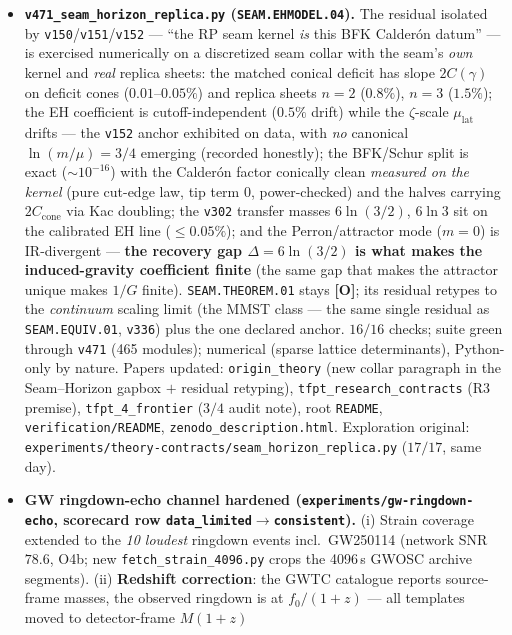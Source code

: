 \documentclass[11pt]{article}
\providecommand{\mO}{\textbf{[O]}}\providecommand{\mX}{\textbf{[X]}}
\begin{document}
\begin{itemize}[leftmargin=1.5em]
\item \textbf{\texttt{v471\_seam\_horizon\_replica.py} (\texttt{SEAM.EHMODEL.04}).} The residual isolated by
\texttt{v150}/\texttt{v151}/\texttt{v152} --- ``the RP seam kernel \emph{is} this BFK Calder\'on datum'' ---
is exercised numerically on a discretized seam collar with the seam's \emph{own} kernel and \emph{real}
replica sheets: the matched conical deficit has slope $2C(\gamma)$ on deficit cones ($0.01$--$0.05\%$) and
replica sheets $n{=}2$ ($0.8\%$), $n{=}3$ ($1.5\%$); the EH coefficient is cutoff-independent ($0.5\%$
drift) while the $\zeta$-scale $\mu_{\mathrm{lat}}$ drifts --- the \texttt{v152} anchor exhibited on data,
with \emph{no} canonical $\ln(m/\mu){=}3/4$ emerging (recorded honestly); the BFK/Schur split is exact
(${\sim}10^{-16}$) with the Calder\'on factor conically clean \emph{measured on the kernel} (pure cut-edge
law, tip term $0$, power-checked) and the halves carrying $2C_{\mathrm{cone}}$ via Kac doubling; the
\texttt{v302} transfer masses $6\ln(3/2)$, $6\ln 3$ sit on the calibrated EH line ($\le0.05\%$); and the
Perron/attractor mode ($m{=}0$) is IR-divergent --- \textbf{the recovery gap $\Delta{=}6\ln(3/2)$ is what
makes the induced-gravity coefficient finite} (the same gap that makes the attractor unique makes $1/G$
finite). \texttt{SEAM.THEOREM.01} stays \mO; its residual retypes to the \emph{continuum} scaling limit
(the MMST class --- the same single residual as \texttt{SEAM.EQUIV.01}, \texttt{v336}) plus the one declared
anchor. $16/16$ checks; suite green through \texttt{v471} (465 modules); numerical (sparse lattice
determinants), Python-only by nature. Papers updated: \texttt{origin\_theory} (new collar paragraph in the
Seam--Horizon gapbox $+$ residual retyping), \texttt{tfpt\_research\_contracts} (R3 premise),
\texttt{tfpt\_4\_frontier} ($3/4$ audit note), root \texttt{README}, \texttt{verification/README},
\texttt{zenodo\_description.html}. Exploration original:
\texttt{experiments/theory-contracts/seam\_horizon\_replica.py} ($17/17$, same day).
\item \textbf{GW ringdown-echo channel hardened (\texttt{experiments/gw-ringdown-echo}, scorecard row
\texttt{data\_limited}${\to}$\texttt{consistent}).} (i) Strain coverage extended to the \emph{10 loudest}
ringdown events incl.\ GW250114 (network SNR $78.6$, O4b; new \texttt{fetch\_strain\_4096.py} crops the
4096\,s GWOSC archive segments). (ii) \textbf{Redshift correction}: the GWTC catalogue reports source-frame
masses, the observed ringdown is at $f_0/(1{+}z)$ --- all templates moved to detector-frame $M(1{+}z)$

\end{itemize}
\end{document}
